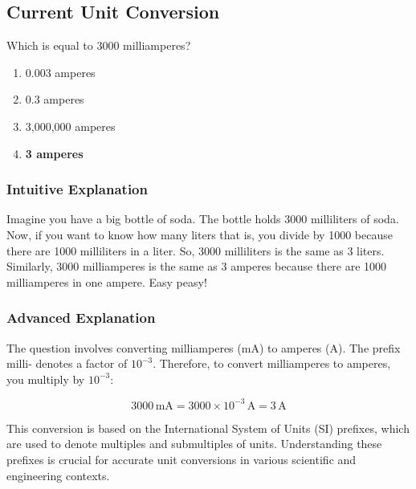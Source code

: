 \subsection{Current Unit Conversion}
\label{T5B06}

\begin{tcolorbox}[colback=gray!10!white,colframe=black!75!black,title=T5B06]
Which is equal to 3000 milliamperes?
\begin{enumerate}[label=\Alph*)]
    \item 0.003 amperes
    \item 0.3 amperes
    \item 3,000,000 amperes
    \item \textbf{3 amperes}
\end{enumerate}
\end{tcolorbox}

\subsubsection{Intuitive Explanation}
Imagine you have a big bottle of soda. The bottle holds 3000 milliliters of soda. Now, if you want to know how many liters that is, you divide by 1000 because there are 1000 milliliters in a liter. So, 3000 milliliters is the same as 3 liters. Similarly, 3000 milliamperes is the same as 3 amperes because there are 1000 milliamperes in one ampere. Easy peasy!

\subsubsection{Advanced Explanation}
The question involves converting milliamperes (mA) to amperes (A). The prefix milli- denotes a factor of \(10^{-3}\). Therefore, to convert milliamperes to amperes, you multiply by \(10^{-3}\):

\[
3000 \, \text{mA} = 3000 \times 10^{-3} \, \text{A} = 3 \, \text{A}
\]

This conversion is based on the International System of Units (SI) prefixes, which are used to denote multiples and submultiples of units. Understanding these prefixes is crucial for accurate unit conversions in various scientific and engineering contexts.

